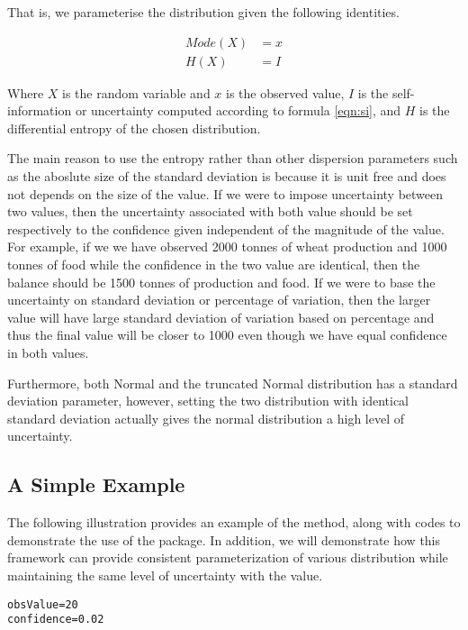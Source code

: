 \documentclass[nojss]{jss}\usepackage[]{graphicx}\usepackage[]{color}
\makeatletter
\newcommand{\hlnum}[1]{\textcolor[rgb]{0.686,0.059,0.569}{#1}}%
\newcommand{\hlstd}[1]{\textcolor[rgb]{0.345,0.345,0.345}{#1}}%
\newcommand{\hlkwb}[1]{\textcolor[rgb]{0.69,0.353,0.396}{#1}}%
\newenvironment{kframe}{%
 \def\at@end@of@kframe{}%
 \ifinner\ifhmode%
  \def\at@end@of@kframe{\end{minipage}}%
  \begin{minipage}{\columnwidth}%
 \fi\fi%
 \def\FrameCommand##1{\hskip\@totalleftmargin \hskip-\fboxsep
 \colorbox{shadecolor}{##1}\hskip-\fboxsep
     \hskip-\linewidth \hskip-\@totalleftmargin \hskip\columnwidth}%
 \MakeFramed {\advance\hsize-\width
   \@totalleftmargin\z@ \linewidth\hsize
   \@setminipage}}%
 {\par\unskip\endMakeFramed%
 \at@end@of@kframe}
\newenvironment{knitrout}{}{} %
\makeatother
\begin{document}
That is, we parameterise the distribution given the following identities.

\begin{align}
  Mode(X) &= x\\ \nonumber
  H(X) &= I
\end{align}

Where $X$ is the random variable and $x$ is the observed value, $I$ is
the self-information or uncertainty computed according to formula
\ref{eqn:si}, and $H$ is the differential entropy of the chosen
distribution.

The main reason to use the entropy rather than other dispersion
parameters such as the aboslute size of the standard deviation is
because it is unit free and does not depends on the size of the
value. If we were to impose uncertainty between two values, then the
uncertainty associated with both value should be set respectively to
the confidence given independent of the magnitude of the value. For
example, if we we have observed 2000 tonnes of wheat production and
1000 tonnes of food while the confidence in the two value are
identical, then the balance should be 1500 tonnes of production and
food. If we were to base the uncertainty on standard deviation or
percentage of variation, then the larger value will have large
standard deviation of variation based on percentage and thus the final
value will be closer to 1000 even though we have equal confidence in
both values.

Furthermore, both Normal and the truncated Normal distribution has a
standard deviation parameter, however, setting the two distribution
with identical standard deviation actually gives the normal
distribution a high level of uncertainty.

\subsection{A Simple Example}

The following illustration provides an example of the method, along
with codes to demonstrate the use of the package. In addition, we will
demonstrate how this framework can provide consistent parameterization
of various distribution while maintaining the same level of
uncertainty with the value. 


\begin{knitrout}
\color{fgcolor}\begin{kframe}
\begin{alltt}
\hlstd{obsValue} \hlkwb{=} \hlnum{20}
\hlstd{confidence} \hlkwb{=} \hlnum{0.02}
\end{alltt}
\end{kframe}
\end{knitrout}
\end{document}
